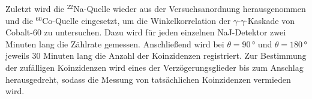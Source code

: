 Zuletzt wird die $^{22}$Na-Quelle wieder aus der Versuchsanordnung herausgenommen und die $^{60}$Co-Quelle eingesetzt, um die Winkelkorrelation der $\gamma$-$\gamma$-Kaskade von Cobalt-$60$ zu untersuchen.
Dazu wird für jeden einzelnen NaJ-Detektor zwei Minuten lang die Zählrate gemessen.
Anschließend wird bei $\theta =90\,$° und $\theta =180\,$° jeweils $30$ Minuten lang die Anzahl der Koinzidenzen registriert.
Zur Bestimmung der zufälligen Koinzidenzen wird eines der Verzögerungsglieder bis zum Anschlag herausgedreht, sodass die Messung von tatsächlichen Koinzidenzen vermieden wird.